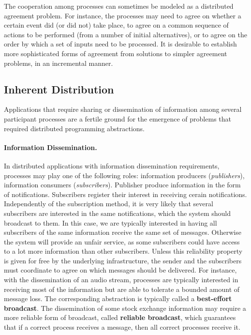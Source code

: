 \documentclass{book}
\begin{document}
The cooperation among processes can sometimes be modeled as a distributed agreement problem. 
For instance, the processes may need to agree on whether a certain event did (or did not) take place, to agree on a common sequence of actions to be performed (from a number of initial alternatives), or to agree on the order by which a set of inputs need to be processed. 
It is desirable to establish more sophisticated forms of agreement from solutions to simpler agreement problems, in an incremental manner.

\subsection{Inherent Distribution}
Applications that require sharing or dissemination of information among several participant processes are a fertile ground for the emergence of problems that required distributed programming abstractions.

\paragraph{Information Dissemination.}
In distributed applications with information dissemination requirements, processes may play one of the following roles:
information producers (\textit{publishers}), information consumers (\textit{subscribers}).
\newline
Publisher produce information in the form of notifications.
Subscribers register their interest in receiving cerain notifications.
\newline
Independently of the subscription method, it is very likely that several subscribers are interested in the same notifications, which the system should broadcast to them.
In this case, we are typically interested in having all subscribers of the same information receive the same set of messages.
Otherwise the system will provide an unfair service, as some subscribers could have access to a lot more information than other subscribers.
\newline
Unless this reliability property is given for free by the underlying infrastructure, the sender and the subscribers must coordinate to agree on which messages should be delivered.
For instance, with the dissemination of an audio stream, processes are typically interested in receiving most of the information but are able to tolerate a bounded amount of message loss.
The corresponding abstraction is typically called a \textbf{best-effort broadcast}.
\newline
The dissemination of some stock exchange information may require a more reliable form of broadcast, called \textbf{reliable broadcast}, which guarantees that if a correct process receives a message, then all correct processes receive it.
\end{document}
